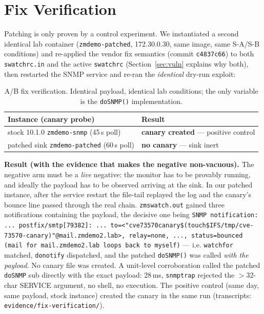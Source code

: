 \documentclass[journal]{IEEEtran}
\begin{document}
\section{Fix Verification}
\label{sec:fix}

Patching is only proven by a control experiment. We instantiated a second
identical lab container (\texttt{zmdemo-patched}, 172.30.0.30, same image,
same S-A/S-B conditions) and re-applied the vendor fix semantics
(commit \texttt{c4837c66}) to both \texttt{swatchrc.in} and the active
\texttt{swatchrc} (Section~\ref{sec:vuln} explains why both), then restarted
the SNMP service and re-ran the \emph{identical} dry-run exploit:

\begin{table}[t]
\centering
\footnotesize
\small
\begin{tabular}{@{}p{3.4cm}p{4.0cm}@{}}
\toprule
Instance (canary probe) & Result \\
\midrule
stock 10.1.0 \texttt{zmdemo-snmp} (45\,s poll) & \textbf{canary created} — positive control \\
patched sink \texttt{zmdemo-patched} (60\,s poll) & \textbf{no canary} — sink inert \\
\bottomrule
\end{tabular}
\caption{A/B fix verification. Identical payload, identical lab conditions;
the only variable is the \texttt{doSNMP()} implementation.}
\label{tab:fix}
\end{table}

\textbf{Result (with the evidence that makes the negative non-vacuous).}
The negative arm must be a \emph{live} negative: the monitor has to be
provably running, and ideally the payload has to be observed arriving at
the sink. In our patched instance, after the service restart the
file-tail replayed the log and the canary's bounce line passed through the
real chain. \texttt{zmswatch.out} gained three notifications containing the
payload, the decisive one being
\texttt{SNMP notification: ... postfix/smtp[79382]: ... to=<"cve73570canary\$(touch\${IFS}/\hspace{0pt}tmp/cve-73570-canary)"@\hspace{0pt}mail.zmdemo2.lab>,
relay=none, ..., status=bounced (mail for mail.zmdemo2.lab loops back to
myself)} — i.e. \texttt{watchfor} matched, \texttt{donotify} dispatched,
and the patched \texttt{doSNMP()} was called \emph{with the payload}.
No canary file was created. A unit-level corroboration called the patched
\texttt{doSNMP} sub directly with the exact payload: 28\,ms, \texttt{snmptrap}
rejected the $>$32-char SERVICE argument, no shell, no execution. The
positive control (same day, same payload, stock instance) created the canary
in the same run (transcripts: \texttt{evidence/fix-verification/}).
\end{document}
